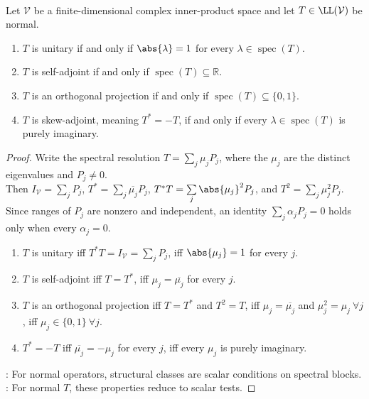 \begin{theorem} \label{thm:normal-spectral-classification-by-eigenvalues} \\
Let $\mathcal{V}$ be a finite-dimensional complex inner-product space and let $T\in\LL(\mathcal{V})$ be normal.
\begin{enumerate}[label=(\roman*)]
\setlength{\itemsep}{0pt}
\item $T$ is unitary if and only if $\abs{\lambda}=1$ for every $\lambda\in\operatorname{spec}(T)$.
\item $T$ is self-adjoint if and only if $\operatorname{spec}(T)\subseteq\mathbb{R}$.
\item $T$ is an orthogonal projection if and only if $\operatorname{spec}(T)\subseteq\{0,1\}$.
\item $T$ is skew-adjoint, meaning $T^*=-T$, if and only if every $\lambda\in\operatorname{spec}(T)$ is purely imaginary.
\end{enumerate}
\begin{proof}
Write the spectral resolution $T=\sum\limits_j\mu_jP_j$, where the $\mu_j$ are the distinct eigenvalues and $P_j\neq0$.\\
Then $I_{\mathcal{V}}=\sum_jP_j$, $T^*=\sum\limits_j\overline{\mu_j}P_j$, $T^*T=\sum\limits_j\abs{\mu_j}^2P_j$, and $T^2=\sum\limits_j\mu_j^2P_j$.\\
Since ranges of $P_j$ are nonzero and independent, an identity $\sum_j\alpha_jP_j=0$ holds only when every $\alpha_j=0$.
\begin{enumerate}[label=(\roman*)]
\setlength{\itemsep}{0pt}
\item $T$ is unitary iff $T^*T=I_{\mathcal{V}}=\sum_jP_j$, iff $\abs{\mu_j}=1$ for every $j$.
\item $T$ is self-adjoint iff $T=T^*$, iff $\mu_j=\overline{\mu_j}$ for every $j$.
\item $T$ is an orthogonal projection iff $T=T^*$ and $T^2=T$, iff $\mu_j=\overline{\mu_j}$ and $\mu_j^2=\mu_j \ \forall j$, iff $\mu_j\in\{0,1\} \ \forall j$.
\item $T^*=-T$ iff $\overline{\mu_j}=-\mu_j$ for every $j$, iff every $\mu_j$ is purely imaginary.
\end{enumerate}
: For normal operators, structural classes are scalar conditions on spectral blocks.\\
: For normal $T$, these properties reduce to scalar tests.
\end{proof}
\end{theorem}

